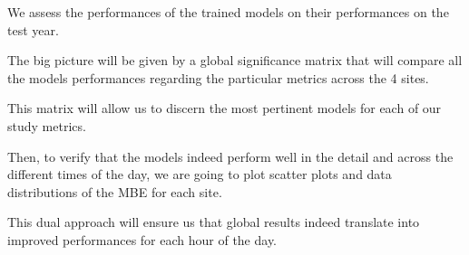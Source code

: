 We assess the performances of the trained models on their performances on the test year.

The big picture will be given by a global significance matrix that will compare all the models performances regarding the particular metrics across the 4 sites.

This matrix will allow us to discern the most pertinent models for each of our study metrics.

Then, to verify that the models indeed perform well in the detail and across the different times of the day, we are going to plot scatter plots and data distributions of the MBE for each site.

This dual approach will ensure us that global results indeed translate into improved performances for each hour of the day.